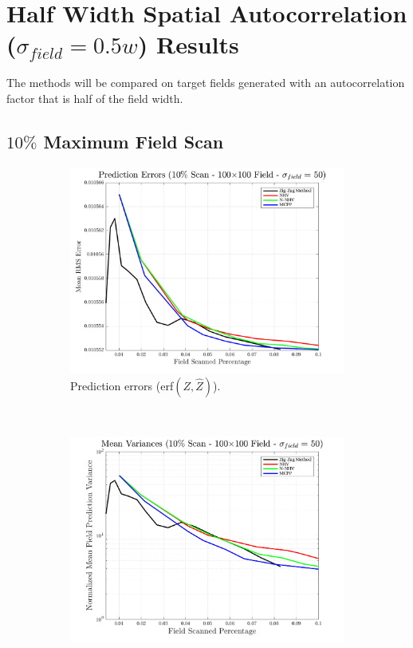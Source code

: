 \section{Half Width Spatial Autocorrelation ($\sigma_{field} = 0.5w$) Results}
The methods will be compared on target fields generated with an autocorrelation factor that is half of the field width.

\clearpage
\subsection{$10\%$ Maximum Field Scan}
\begin{figure}[htb!]
    \centering
    \begin{subfigure}[t]{0.65\textwidth}
        \centering
        \includegraphics[width=\linewidth]{figures/hbresults/pred_errs_10p_100x100_sf_50_seed_2.png}
        \captionsetup{skip=0.20\baselineskip,size=footnotesize}
        \caption{Prediction errors (erf$(Z,\hat{Z})$).}
        \label{fig:prederrs_sigma50_p10_s2}
    \end{subfigure}%
    \\
    \begin{subfigure}[t]{0.65\textwidth}
        \centering
        \includegraphics[width=\linewidth]{figures/hbresults/vars_10p_100x100_sf_50_seed_2.png}

\end{subfigure}
\end{figure}
